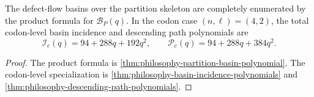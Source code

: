 \begin{theorem}
\label{thm:philosophy-partition-basin-polynomial-theorem}
The defect-flow basins over the partition skeleton are completely
enumerated by the product formula for $\mathcal{B}_{P}(q)$. In the
codon case $(n,\ell)=(4,2)$, the total codon-level basin incidence and
descending path polynomials are
$$
  \mathcal{I}_{c}(q)=94+288q+192q^{2},
  \qquad
  \mathcal{P}_{c}(q)=94+288q+384q^{2}.
$$
\end{theorem}
\begin{proof}
The product formula is
\autoref{thm:philosophy-partition-basin-polynomial}. The codon-level
specialization is
\autoref{thm:philosophy-basin-incidence-polynomials} and
\autoref{thm:philosophy-descending-path-polynomials}.
\end{proof}


